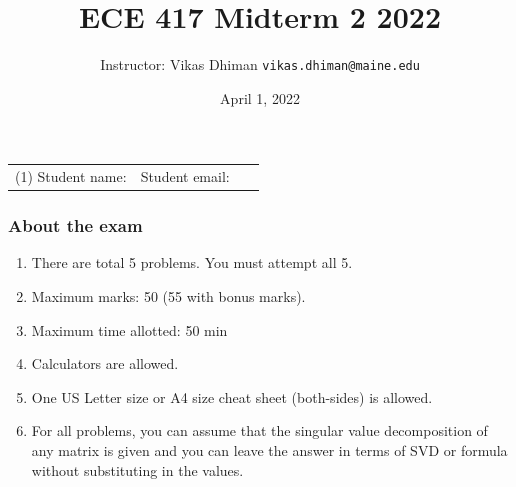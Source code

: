 \documentclass{article}
\title{ECE 417 Midterm 2 2022}
\date{April 1, 2022}
\author{Instructor: Vikas Dhiman \texttt{vikas.dhiman@maine.edu}}
\begin{document}
\maketitle

\begin{tabular}{p{0.5\linewidth}p{0.5\linewidth}}
  (1) Student name:& Student email: \\
\end{tabular}

\subsubsection*{About the exam}
\begin{enumerate}
  \item There are total 5 problems. You must attempt all 5. 
  \item Maximum marks: 50 (55 with bonus marks).
  \item Maximum time allotted:  50 min
  \item Calculators are allowed.
  \item One US Letter size or A4 size cheat sheet (both-sides) is allowed.
  \item For all problems, you can assume that the singular value decomposition
    of any matrix is given and you can leave the answer in terms of SVD or
    formula without substituting in the values.
\end{enumerate}
\end{document}
